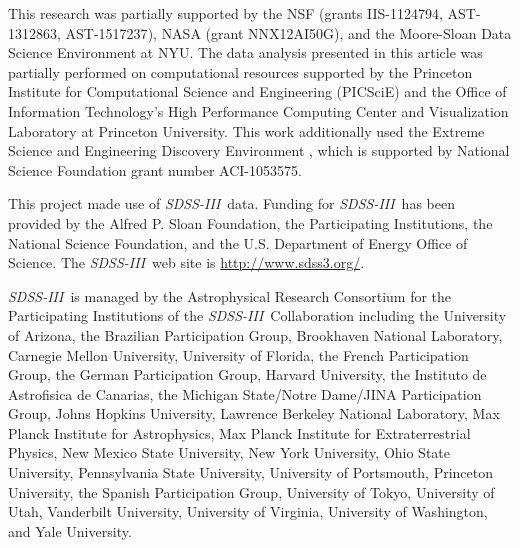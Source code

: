 \documentclass[manuscript, letterpaper]{aastex6}
\newcommand{\project}[1]{\textsl{#1}}
\newcommand{\acronym}[1]{{\small{#1}}}
\newcommand{\apogee}{\project{\acronym{APOGEE}}}
\newcommand{\sdssiii}{\project{\acronym{SDSS-III}}}
\begin{document}
This research was partially supported by
  the \acronym{NSF} (grants \acronym{IIS-1124794}, \acronym{AST-1312863}, \acronym{AST-1517237}),
  \acronym{NASA} (grant \acronym{NNX12AI50G}),
  and the Moore-Sloan Data Science Environment at \acronym{NYU}.
The data analysis presented in this article was partially performed on
computational resources supported by the Princeton Institute for Computational
Science and Engineering (PICSciE) and the Office of Information Technology's
High Performance Computing Center and Visualization Laboratory at Princeton
University.
This work additionally used the Extreme Science and Engineering Discovery
Environment \citep[XSEDE;][]{Towns:2014}, which is supported by National
Science Foundation grant number ACI-1053575.

This project made use of \sdssiii\ data. Funding for \sdssiii\ has been
provided by the Alfred P. Sloan Foundation, the Participating Institutions, the
National Science Foundation, and the \acronym{U.S.} Department of Energy Office
of Science. The \sdssiii\ web site is \url{http://www.sdss3.org/}.

\sdssiii\ is managed by the Astrophysical Research Consortium for the
Participating Institutions of the \sdssiii\ Collaboration including the
University of Arizona, the Brazilian Participation Group, Brookhaven National
Laboratory, Carnegie Mellon University, University of Florida, the French
Participation Group, the German Participation Group, Harvard University, the
Instituto de Astrofisica de Canarias, the Michigan State/Notre
Dame/\acronym{JINA} Participation Group, Johns Hopkins University, Lawrence
Berkeley National Laboratory, Max Planck Institute for Astrophysics, Max Planck
Institute for Extraterrestrial Physics, New Mexico State University, New York
University, Ohio State University, Pennsylvania State University, University of
Portsmouth, Princeton University, the Spanish Participation Group, University
of Tokyo, University of Utah, Vanderbilt University, University of Virginia,
University of Washington, and Yale University.


\facility{\sdssiii, \apogee}



\end{document}
